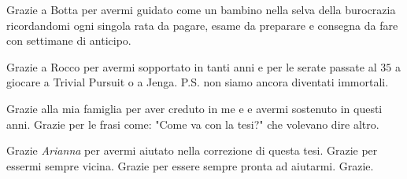 Grazie a Botta per avermi guidato come un bambino nella selva della burocrazia
ricordandomi ogni singola rata da pagare, esame da preparare e consegna da fare
con settimane di anticipo.

Grazie a Rocco per avermi sopportato in tanti anni e per le serate passate al $35$ a
giocare a Trivial Pursuit o a Jenga. P.S. non siamo ancora diventati immortali.

Grazie alla mia famiglia per aver creduto in me e e avermi sostenuto in questi
anni. Grazie per le frasi come: "Come va con la tesi?" che volevano dire altro.

Grazie \emph{Arianna} per avermi aiutato nella correzione di questa tesi. Grazie
per essermi sempre vicina. Grazie per essere sempre pronta ad aiutarmi. Grazie.

\bigskip
 
\endgroup

